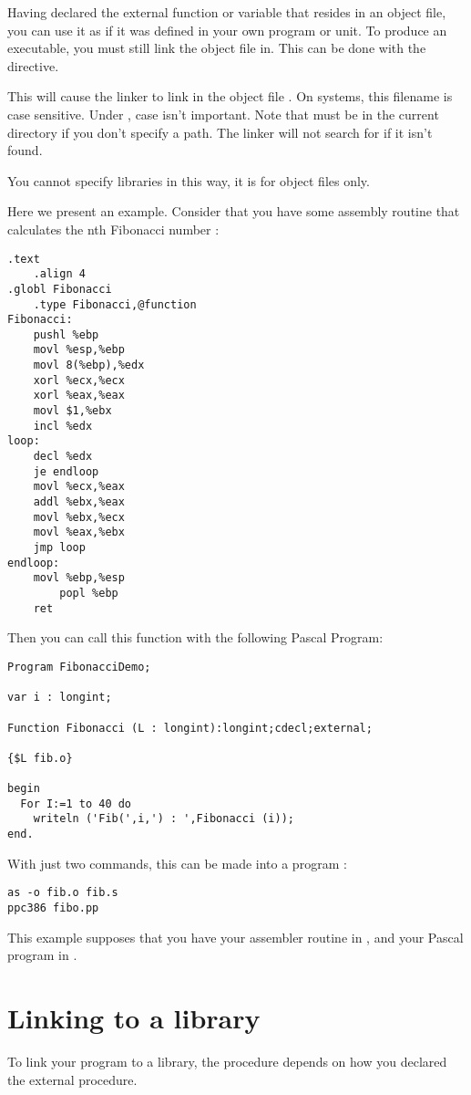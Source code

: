 \documentclass{report}
\begin{document}
Having declared the external function or variable that resides in an object file,
you can use it as if it was defined in your own program or unit.
To produce an executable, you must still link the object file in.
This can be done with the  directive.

This will cause the linker to link in the object file . On
\linux systems, this filename is case sensitive. Under \dos, case isn't
important. Note that  must be in the current directory if you
don't specify a path. The linker will not search for  if it
isn't found.

You cannot specify libraries in this way, it is for object files only.

Here we present an example. Consider that you have some assembly routine that
calculates the nth Fibonacci number :
\begin{verbatim}
.text
	.align 4
.globl Fibonacci
	.type Fibonacci,@function
Fibonacci:
	pushl %ebp
	movl %esp,%ebp
	movl 8(%ebp),%edx
	xorl %ecx,%ecx
	xorl %eax,%eax
	movl $1,%ebx
	incl %edx
loop:
	decl %edx
	je endloop
	movl %ecx,%eax
	addl %ebx,%eax
	movl %ebx,%ecx
	movl %eax,%ebx
	jmp loop
endloop:
	movl %ebp,%esp
        popl %ebp
	ret
\end{verbatim}
Then you can call this function with the following Pascal Program:
\begin{verbatim}
Program FibonacciDemo;

var i : longint;

Function Fibonacci (L : longint):longint;cdecl;external;

{$L fib.o}

begin
  For I:=1 to 40 do
    writeln ('Fib(',i,') : ',Fibonacci (i));
end.
\end{verbatim}
With just two commands, this can be made into a program :
\begin{verbatim}
as -o fib.o fib.s
ppc386 fibo.pp
\end{verbatim}
This example supposes that you have your assembler routine in ,
and your Pascal program in .

\section{Linking to a library}
\label{se:LinkOut}

To link your program to a library, the procedure depends on how you declared
the external procedure. 
\end{document}
